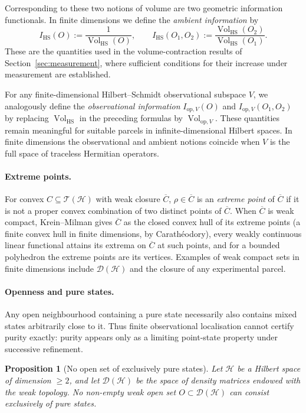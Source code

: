 \documentclass[11pt, onecolumn]{article}
\newtheorem{proposition}{Proposition}
\begin{document}
Corresponding to these two notions of volume are two geometric
information functionals. In finite dimensions we define the
\emph{ambient information} by
\[
I_{\mathrm{HS}}(O)
:=
\frac{1}{\operatorname{Vol}_{\mathrm{HS}}(O)},
\qquad
I_{\mathrm{HS}}(O_1,O_2)
:=
\frac{\operatorname{Vol}_{\mathrm{HS}}(O_2)}
{\operatorname{Vol}_{\mathrm{HS}}(O_1)}.
\]
These are the quantities used in the volume-contraction results of
Section~\ref{sec:measurement}, where sufficient conditions for their
increase under measurement are established.

For any finite-dimensional Hilbert--Schmidt observational subspace $V$,
we analogously define the \emph{observational information}
$I_{\mathrm{op},V}(O)$ and
$I_{\mathrm{op},V}(O_1,O_2)$ by replacing
$\operatorname{Vol}_{\mathrm{HS}}$ in the preceding formulas by
$\operatorname{Vol}_{\mathrm{op},V}$. These quantities remain meaningful
for suitable parcels in infinite-dimensional Hilbert spaces. In finite dimensions the observational and ambient
notions coincide when $V$ is the full space of traceless Hermitian
operators.

\paragraph{Extreme points.}
For convex $C\subseteq\mathcal T(\mathcal H)$ with weak closure $\overline C$, $\rho\in\overline C$ is an \emph{extreme point} of $\overline C$ if it is not a proper convex combination of two distinct points of $\overline C$. When $\overline C$ is weak compact, Krein--Milman gives $\overline C$ as the closed convex hull of its extreme points (a finite convex hull in finite dimensions, by Carathéodory), every weakly continuous linear functional attains its extrema on $\overline C$ at such points, and for a bounded polyhedron the extreme points are its vertices. Examples of weak compact sets in finite dimensions include $\mathcal D(\mathcal H)$ and the closure of any experimental parcel.

\paragraph{Openness and pure states.}
Any open neighbourhood containing a pure state necessarily also contains mixed states arbitrarily close to it. Thus finite observational localisation cannot certify purity exactly: purity appears only as a limiting point-state property under successive refinement.

\begin{proposition}[No open set of exclusively pure states]\label{prop:no-open-pure-states}
Let $\mathcal{H}$ be a Hilbert space of dimension $\ge 2$, and let $\mathcal{D}(\mathcal{H})$ be the space of density matrices endowed with the weak topology. No non-empty weak open set $O \subset \mathcal{D}(\mathcal{H})$ can consist exclusively of pure states.
\end{proposition}
\end{document}
